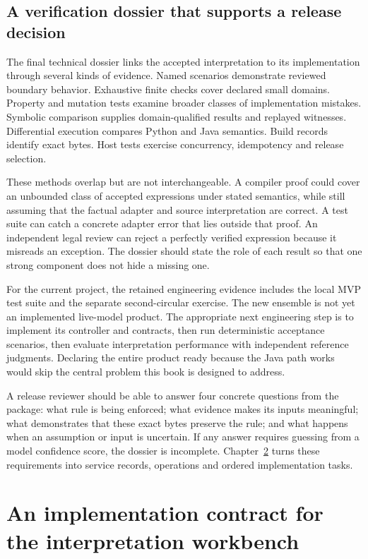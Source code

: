 \documentclass[12pt,a4paper,oneside,openany]{book}
\begin{document}
\section{A verification dossier that supports a release decision}

The final technical dossier links the accepted interpretation to its implementation
through several kinds of evidence. Named scenarios demonstrate reviewed boundary
behavior. Exhaustive finite checks cover declared small domains. Property and
mutation tests examine broader classes of implementation mistakes. Symbolic
comparison supplies domain-qualified results and replayed witnesses. Differential
execution compares Python and Java semantics. Build records identify exact bytes.
Host tests exercise concurrency, idempotency and release selection.

These methods overlap but are not interchangeable. A compiler proof could cover
an unbounded class of accepted expressions under stated semantics, while still
assuming that the factual adapter and source interpretation are correct. A test
suite can catch a concrete adapter error that lies outside that proof. An
independent legal review can reject a perfectly verified expression because it
misreads an exception. The dossier should state the role of each result so that
one strong component does not hide a missing one.

For the current project, the retained engineering evidence includes the local
MVP test suite and the separate second-circular exercise. The new ensemble is not
yet an implemented live-model product. The appropriate next engineering step is
to implement its controller and contracts, then run deterministic acceptance
scenarios, then evaluate interpretation performance with independent reference
judgments. Declaring the entire product ready because the Java path works would
skip the central problem this book is designed to address.

A release reviewer should be able to answer four concrete questions from the
package: what rule is being enforced; what evidence makes its inputs meaningful;
what demonstrates that these exact bytes preserve the rule; and what happens when
an assumption or input is uncertain. If any answer requires guessing from a model
confidence score, the dossier is incomplete. Chapter~\ref{ch:implementation} turns
these requirements into service records, operations and ordered implementation
tasks.

\chapter{An implementation contract for the interpretation workbench}
\label{ch:implementation}
\end{document}
